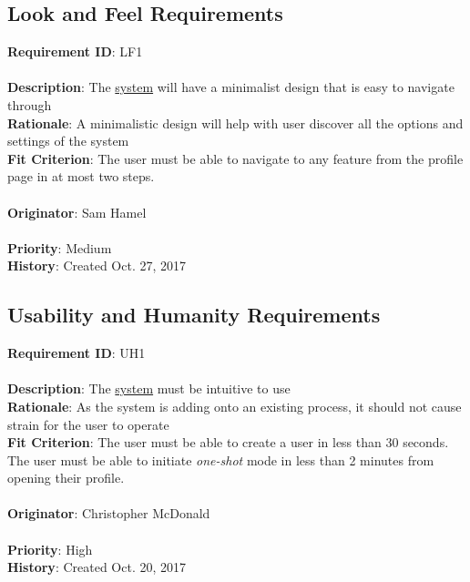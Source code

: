 \documentclass[11pt]{article}
\begin{document}
\subsection{Look and Feel Requirements}
\begin{framed}
	\noindent\textbf{Requirement ID}: LF1 \hfill\\\\
	\noindent\textbf{Description}: The \hyperref[sec:definitions]{system} will have a minimalist design that is easy to navigate through \\
	\textbf{Rationale}: A minimalistic design will help with user discover all the options and settings of the system  \\
	\textbf{Fit Criterion}: The user must be able to navigate to any feature from the profile page in at most two steps.  \\\\
	\textbf{Originator}: Sam Hamel \\\\
	\textbf{Priority}: Medium \hfill \\
	\noindent\textbf{History}: Created Oct. 27, 2017
\end{framed}

\subsection{Usability and Humanity Requirements}
\begin{framed}
	\noindent\textbf{Requirement ID}: UH1 \hfill\\\\
	\noindent\textbf{Description}: The \hyperref[sec:definitions]{system} must be intuitive to use \\
	\textbf{Rationale}: As the system is adding onto an existing process, it should not cause strain for the user to operate \\
	\textbf{Fit Criterion}: The user must be able to create a user in less than 30 seconds. The user must be able to initiate \textit{one-shot} mode in less than 2 minutes from opening their profile.  \\\\
	\textbf{Originator}: Christopher McDonald \\\\
	\textbf{Priority}: High \hfill \\
	\noindent\textbf{History}: Created Oct. 20, 2017
\end{framed}
\end{document}

